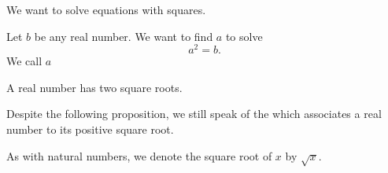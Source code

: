 
\sbasic





















\sstart
{}



We want to solve equations
with squares.

Let $b$ be any real
number.
We want to find $a$
to solve
\[
  a^2 = b.
\]
We call $a$

\begin{prop}
A real number has two square
roots.
\end{prop}

Despite the following proposition,
we still speak of the
which associates a real number to
its positive square root.


As with natural numbers, we denote
the square root of $x$ by $\sqrt{x}$.
\strats

